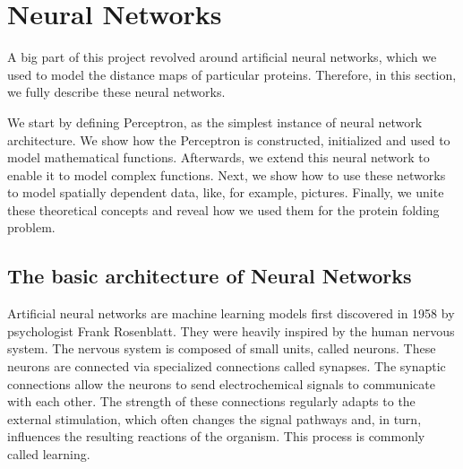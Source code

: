 \newpage
\section{Neural Networks}
A big part of this project revolved around artificial neural networks, which we used to model the distance maps of particular proteins. 
Therefore, in this section, we fully describe these neural networks.

We start by defining Perceptron, as the simplest instance of neural network architecture.
We show how the Perceptron is constructed, initialized and used to model mathematical functions.
Afterwards, we extend this neural network to enable it to model complex functions.
Next, we show how to use these networks to model spatially dependent data, like, for example, pictures.
Finally, we unite these theoretical concepts and reveal how we used them for the protein folding problem.






\subsection{The basic architecture of Neural Networks}
Artificial neural networks are machine learning models first discovered in 1958 by psychologist Frank Rosenblatt. %
They were heavily inspired by the human nervous system.
The nervous system is composed of small units, called neurons.
These neurons are connected via specialized connections called synapses.
The synaptic connections allow the neurons to send electrochemical signals to communicate with each other.
The strength of these connections regularly adapts to the external stimulation, which often changes the signal pathways and, in turn, influences the resulting reactions of the organism.
This process is commonly called learning.

